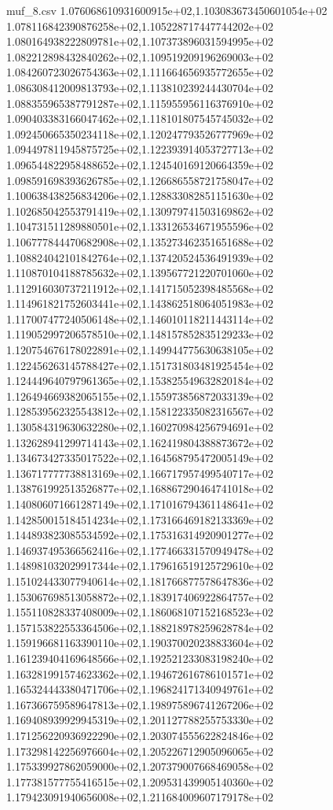 \begin{filecontents*}{muf_8.csv}
1.076068610931600915e+02,1.103083673450601054e+02
1.078116842390876258e+02,1.105228717447744202e+02
1.080164938222809781e+02,1.107373896031594995e+02
1.082212898432840262e+02,1.109519209196269003e+02
1.084260723026754363e+02,1.111664656935772655e+02
1.086308412009813793e+02,1.113810239244430704e+02
1.088355965387791287e+02,1.115955956116376910e+02
1.090403383166047462e+02,1.118101807545745032e+02
1.092450665350234118e+02,1.120247793526777969e+02
1.094497811945875725e+02,1.122393914053727713e+02
1.096544822958488652e+02,1.124540169120664359e+02
1.098591698393626785e+02,1.126686558721758047e+02
1.100638438256834206e+02,1.128833082851151630e+02
1.102685042553791419e+02,1.130979741503169862e+02
1.104731511289880501e+02,1.133126534671955596e+02
1.106777844470682908e+02,1.135273462351651688e+02
1.108824042101842764e+02,1.137420524536491939e+02
1.110870104188785632e+02,1.139567721220701060e+02
1.112916030737211912e+02,1.141715052398485568e+02
1.114961821752603441e+02,1.143862518064051983e+02
1.117007477240506148e+02,1.146010118211443114e+02
1.119052997206578510e+02,1.148157852835129233e+02
1.120754676178022891e+02,1.149944775630638105e+02
1.122456263145788427e+02,1.151731803481925454e+02
1.124449640797961365e+02,1.153825549632820184e+02
1.126494669382065155e+02,1.155973856872033139e+02
1.128539562325543812e+02,1.158122335082316567e+02
1.130584319630632280e+02,1.160270984256794691e+02
1.132628941299714143e+02,1.162419804388873672e+02
1.134673427335017522e+02,1.164568795472005149e+02
1.136717777738813169e+02,1.166717957499540717e+02
1.138761992513526877e+02,1.168867290464741018e+02
1.140806071661287149e+02,1.171016794361148641e+02
1.142850015184514234e+02,1.173166469182133369e+02
1.144893823085534592e+02,1.175316314920901277e+02
1.146937495366562416e+02,1.177466331570949478e+02
1.148981032029917344e+02,1.179616519125729610e+02
1.151024433077940614e+02,1.181766877578647836e+02
1.153067698513058872e+02,1.183917406922864757e+02
1.155110828337408009e+02,1.186068107152168523e+02
1.157153822553364506e+02,1.188218978259628784e+02
1.159196681163390110e+02,1.190370020238833604e+02
1.161239404169648566e+02,1.192521233083198240e+02
1.163281991574623362e+02,1.194672616786101571e+02
1.165324443380471706e+02,1.196824171340949761e+02
1.167366759589647813e+02,1.198975896741267206e+02
1.169408939929945319e+02,1.201127788255753330e+02
1.171256220936922290e+02,1.203074555622824846e+02
1.173298142256976604e+02,1.205226712905096065e+02
1.175339927862059000e+02,1.207379007668469058e+02
1.177381577755416515e+02,1.209531439905140360e+02
1.179423091940656008e+02,1.211684009607179178e+02

\end{filecontents*}
